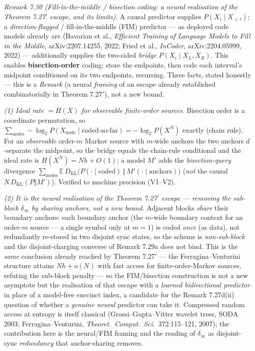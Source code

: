 \documentclass[
]{article}
\begin{document}
\emph{Remark 7.30 (Fill-in-the-middle / bisection coding: a neural realisation of the
Theorem 7.27$'$ escape, and its limits).} A causal predictor supplies $P(X_i\mid X_{<i})$;
a \emph{direction-flagged} / fill-in-the-middle (FIM) predictor --- as deployed code models
already are (Bavarian et al., \emph{Efficient Training of Language Models to Fill in the
Middle}, arXiv:2207.14255, 2022; Fried et al., \emph{InCoder}, arXiv:2204.05999, 2022) ---
additionally supplies the two-sided \emph{bridge} $P(X_i\mid X_L,X_R)$. This enables
\textbf{bisection-order} coding: store the endpoints, then code each interval's midpoint
conditioned on its two endpoints, recursing. Three facts, stated honestly --- this is a
\emph{Remark} (a neural \emph{framing} of an escape already established combinatorially in
Theorem 7.27$'$), not a new bound.

\emph{(1) Ideal rate $=H(X)$ for observable finite-order sources.} Bisection order is a
coordinate permutation, so $\sum_{\text{nodes}}-\log_2 P(X_{\text{node}}\mid
\text{coded-so-far})=-\log_2 P(X^N)$ exactly (chain rule). For an \emph{observable}
order-$m$ Markov source with $m$-wide anchors the two anchors $d$-separate the midpoint, so
the bridge equals the chain-rule conditional and the ideal rate is $H(X^N)=Nh+O(1)$; a
model $M'$ adds the \emph{bisection-query} divergence $\sum_{\text{nodes}}\mathbb E\,
D_{\mathrm{KL}}\!\big(P(\cdot\mid\text{coded})\,\Vert\,M'(\cdot\mid\text{anchors})\big)$
(\emph{not} the causal $N\,D_{\mathrm{KL}}(P\Vert M')$). Verified to machine precision
(V1--V2).

\emph{(2) It is the \emph{neural} realisation of the Theorem 7.27$'$ escape --- removing
the sub-block $\delta_\infty$ by \emph{sharing} anchors, not a new bound.} Adjacent blocks
\emph{share} their boundary anchors: each boundary anchor (the $m$-wide boundary context
for an order-$m$ source --- a single symbol only at $m=1$) is coded \emph{once} (as data),
not redundantly re-stored in two disjoint sync states, so the scheme is
\emph{non-sub-block} and the disjoint-charging converse of Remark 7.29a does not bind. This
is the \emph{same} conclusion already reached by Theorem 7.27$'$ --- the
Ferragina--Venturini structure attains $Nh+o(N)$ with fast access for finite-order-Markov
sources, refuting the sub-block penalty --- so the FIM/bisection construction is not a new
asymptote but the realisation of that escape with a \emph{learned bidirectional predictor}
in place of a model-free succinct index, a candidate for the Remark 7.27d(ii) question of
whether a \emph{genuine neural} predictor can take it. Compressed random access at entropy
is itself classical (Grossi--Gupta--Vitter wavelet trees, SODA 2003; Ferragina--Venturini,
\emph{Theoret.\ Comput.\ Sci.}\ 372:115--121, 2007); the contribution here is the
neural/FIM framing and the reading of $\delta_\infty$ as disjoint-sync \emph{redundancy}
that anchor-sharing removes.
\end{document}

